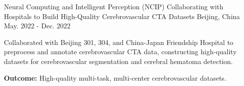 \begin{cventries}
  \cventry
  {Neural Computing and Intelligent Perception (NCIP)}
  {Collaborating with Hospitals to Build High-Quality Cerebrovascular CTA Datasets}
  {Beijing, China}
  {May. 2022 - Dec. 2022}
  {
    \begin{cvitems}
      \item {Collaborated with Beijing 301, 304, and China-Japan Friendship Hospital to preprocess and annotate cerebrovascular CTA data, constructing high-quality datasets for cerebrovascular segmentation and cerebral hematoma detection.}
      \item {\textbf{Outcome:} High-quality multi-task, multi-center cerebrovascular datasets.}
    \end{cvitems}
  }
\end{cventries}
